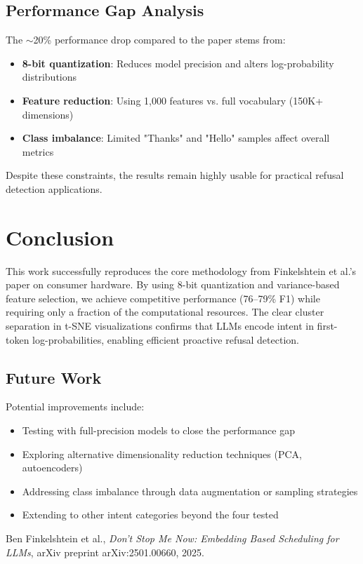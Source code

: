 \documentclass[11pt]{article}
\begin{document}
\subsection{Performance Gap Analysis}

The $\sim$20\% performance drop compared to the paper stems from:
\begin{itemize}
    \item \textbf{8-bit quantization}: Reduces model precision and alters log-probability distributions
    \item \textbf{Feature reduction}: Using 1,000 features vs. full vocabulary (150K+ dimensions)
    \item \textbf{Class imbalance}: Limited "Thanks" and "Hello" samples affect overall metrics
\end{itemize}

Despite these constraints, the results remain highly usable for practical refusal detection applications.

\section{Conclusion}

This work successfully reproduces the core methodology from Finkelshtein et al.'s paper on consumer hardware. By using 8-bit quantization and variance-based feature selection, we achieve competitive performance (76--79\% F1) while requiring only a fraction of the computational resources. The clear cluster separation in t-SNE visualizations confirms that LLMs encode intent in first-token log-probabilities, enabling efficient proactive refusal detection.

\subsection{Future Work}

Potential improvements include:
\begin{itemize}
    \item Testing with full-precision models to close the performance gap
    \item Exploring alternative dimensionality reduction techniques (PCA, autoencoders)
    \item Addressing class imbalance through data augmentation or sampling strategies
    \item Extending to other intent categories beyond the four tested
\end{itemize}

\begin{thebibliography}{9}
Ben Finkelshtein et al.,
\textit{Don't Stop Me Now: Embedding Based Scheduling for LLMs},
arXiv preprint arXiv:2501.00660, 2025.
\end{thebibliography}
\end{document}
